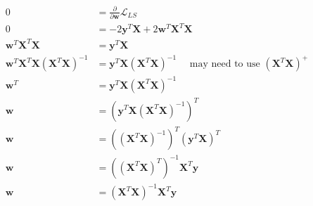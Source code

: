\newcommand{\matrix}[1]{\mathbf{#1}}
\newcommand{\vector}[1]{\mathbf{#1}}
\newcommand{\X}{\matrix{X}}
\newcommand{\y}{\vector{y}}
\newcommand{\w}{\vector{w}}
\begin{align*}
0 &= \frac{\partial}{\partial \w} \mathcal{L}_{LS} \\
0 &= -2\y^T\X + 2\w^T\X^T\X \\
\w^T\X^T\X &= \y^T\X \\
\w^T\X^T\X(\X^T\X)^{-1} &= \y^T\X(\X^T\X)^{-1} \quad \text{ may need to use } (\X^T\X)^+ \\
\w^T &= \y^T\X(\X^T\X)^{-1} \\
\w &= (\y^T\X(\X^T\X)^{-1})^T \\
\w &= ((\X^T\X)^{-1})^T (\y^T\X)^T \\
\w &= ((\X^T\X)^T)^{-1} \X^T\y \\
\w &= (\X^T\X)^{-1} \X^T\y \\
\end{align*}
